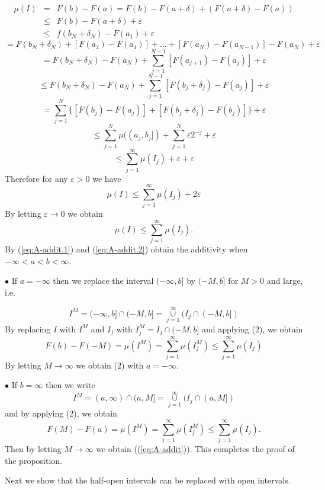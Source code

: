 \documentclass[12pt]{report}
\begin{document}
\begin{eqnarray*}
\mu(I) &=& F(b) - F(a) = F(b) - F(a + \delta) + (F(a + \delta) - F(a))\\ &\le&
F(b) - F(a + \delta) + \varepsilon\\ &\le& f(b_N + \delta_N) - F(a_1) +
\varepsilon\end{eqnarray*}
\[ = F(b_N + \delta_N) +   [F(a_2) - F(a_1) ]  +\dots + [F(a_N) -
F(a_{N-1})]  - F(a_N) + \varepsilon
\]
\[ = F(b_N + \delta_N) - F(a_N) + \sum^{N-1}_{j=1} [F(a_{j+1}) - F(a_j)] +
\varepsilon
\]
\[
\le F(b_N + \delta_N) - F(a_N) + \sum^{N-1}_{j=1} [F(b_j + \delta_j) -
F(a_j)] +
\varepsilon
\]
\[ = \sum^N_{j=1} \{[F(b_j) - F(a_j)] + [F(b_j + \delta_j) - F(b_j)]
\} +
\varepsilon
\]
\[
\le \sum^N_{j=1} \mu ((a_j, b_j]) + \sum_{j=1}^N \varepsilon 2^{-j} +
\varepsilon
\]
\[
\le \sum^\infty_{j=1} \mu(I_j) + \varepsilon + \varepsilon
\] Therefore for any $\varepsilon > 0 $ we have
\[
\mu(I) \le \sum^\infty_{j=1} \mu(I_j) + 2 \varepsilon
\] By letting $\varepsilon \to 0 $ we obtain
\begin{equation}\label{eq:A-addit.2}
\mu(I) \le \sum^\infty_{j=1} \mu(I_j).
\end{equation}
 By (\ref{eq:A-addit.1}) and (\ref{eq:A-addit.2}) obtain the
additivity when
$-
\infty < a < b <
\infty$.

\medskip
\noindent
$\bullet $  If $a = - \infty$ then we replace the interval $(- \infty, b]$ by
$(-M, b]$ for $M > 0 $ and large, i.e.

\[I^M = (- \infty, b] \cap (-M, b] = \overset{\infty}{\underset{j=1}{\cup}} 
(I_j \cap (-M, b])
\] By replacing $I$ with $I^M$ and $I_j$ with $I^M_j = I_j \cap (-M, b]$ and
applying (2), we obtain
\[ F(b) - F(-M) = \mu(I^M) = \sum^\infty_{j=1} \mu\left ( I^M_j \right ) \le
\sum^\infty_{j=1} \mu (I_j)
\] By letting $M \to \infty$ we obtain (2) with $a = - \infty$.  

\medskip
\noindent
$\bullet $  
If $b =
\infty$ then we write
\[ I^M = (a, \infty) \cap (a, M] = \overset{\infty}{\underset{j=1}{\cup}}  (I_j
\cap (a, M])
\] and by applying (2), we obtain
\[ F(M) - F(a) = \mu (I^M) = \sum^\infty_{j=1} \mu(I^M_j) \le
\sum^\infty_{j=1}
\mu(I_j).
\] Then by letting $M \to \infty$ we obtain ((\ref{eq:A-addit})).  This
completes the proof of the proposition.

\bigskip
\noindent Next we show that the half-open intervals can be replaced with
open intervals.
\end{document}
